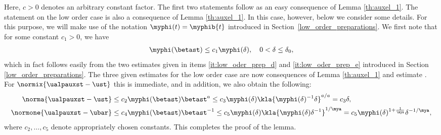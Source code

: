 \documentclass[10pt]{article}
\theoremstyle{definition}
\begin{document}
%
Here, $ c > 0 $ denotes an arbitrary constant factor.
The first two statements follow as an easy consequence of Lemma \ref{th:auxel_1}.
The statement on the low order case is also a consequence of Lemma \ref{th:auxel_1}. In this case, however, below we consider some details.
For this purpose, we will make use of the notation
$ \myphi(t) = \myphib{t} $
introduced in Section~\ref{low_order_preparations}.
%
We first note that for some constant $ c_1 > 0 $, we have
\begin{align}
\myphi(\betast) \le c_1 \myphi(\delta), \quad 0 < \delta \le \delta_0,
\label{eq:auxel-2-ca}
\end{align}
which in fact follows easily from the two estimates
given in items \ref{it:low_oder_prep_d} and \ref{it:low_oder_prep_e}
introduced in Section \ref{low_order_preparations}.
%
%
The three given estimates for the low order case are now consequences
of Lemma \ref{th:auxel_1} and estimate .
For $ \normix{\ualpauxst - \ust} $ this is immediate, and in addition,
we also obtain the following:
%
\begin{align*}
\norma{\ualpauxst - \ust} & \le c_2 \myphi(\betast) \betast^a
\le c_3 \myphi(\delta) \kla{\myphi(\delta)^{-1} \delta}^{a/a}
= c_3 \delta, \\
\normone{\ualpauxst - \ubar} & \le c_4 \myphi(\betast) \betast^{-1}
\le c_5 \myphi(\delta) \kla{\myphi(\delta) \delta^{-1}}^{1/\mya}
= c_5 \myphi(\delta)^{1+\frac{1}{\mya}} \delta^{-1/\mya},
\end{align*}
%
where $ c_2, \ldots, c_5 $ denote appropriately chosen constants.
This completes the proof of the lemma.
\proofend
\end{document}
